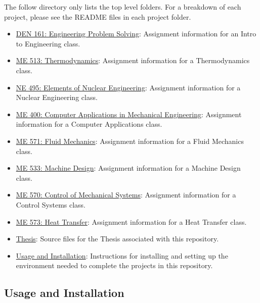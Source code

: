 The follow directory only lists the top level folders. For a breakdown of each project, please see the README files in each project folder.
\begin{itemize}
    \item \href{https://github.com/mKiloLA/python-based-mne/tree/master/3-engineering-problem-solving}{DEN 161: Engineering Problem Solving}: Assignment information for an Intro to Engineering class.
    \item \href{https://github.com/mKiloLA/python-based-mne/tree/master/4-thermodynamics}{ME 513: Thermodynamics}: Assignment information for a Thermodynamics class.
    \item \href{https://github.com/mKiloLA/python-based-mne/tree/master/5-elements-of-nuclear-engineering}{NE 495: Elements of Nuclear Engineering}: Assignment information for a Nuclear Engineering class.
    \item \href{https://github.com/mKiloLA/python-based-mne/tree/master/6-computer-applications-in-me}{ME 400: Computer Applications in Mechanical Engineering}: Assignment information for a Computer Applications class.
    \item \href{https://github.com/mKiloLA/python-based-mne/tree/master/7-fluid-mechanics}{ME 571: Fluid Mechanics}: Assignment information for a Fluid Mechanics class.
    \item \href{https://github.com/mKiloLA/python-based-mne/tree/master/8-machine-design}{ME 533: Machine Design}: Assignment information for a Machine Design class.
    \item \href{https://github.com/mKiloLA/python-based-mne/tree/master/9-control-of-mechanical-systems}{ME 570: Control of Mechanical Systems}: Assignment information for a Control Systems class.
    \item \href{https://github.com/mKiloLA/python-based-mne/tree/master/10-heat-transfer}{ME 573: Heat Transfer}: Assignment information for a Heat Transfer class.
    \item \href{https://github.com/mKiloLA/python-based-mne/tree/master/thesis}{Thesis}: Source files for the Thesis associated with this repository.
    \item \href{https://github.com/mKiloLA/python-based-mne/tree/master/usage-and-installation}{Usage and Installation}: Instructions for installing and setting up the environment needed to complete the projects in this repository.
\end{itemize}

\subsection*{Usage and Installation}

